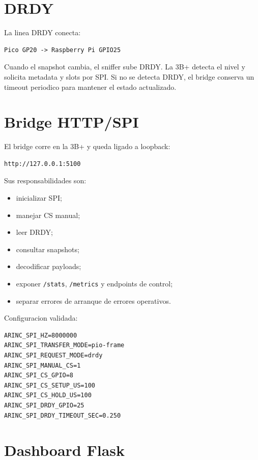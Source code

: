 \documentclass[12pt,a4paper,oneside]{report}
\begin{document}
\section{DRDY}

La linea DRDY conecta:

\begin{lstlisting}
Pico GP20 -> Raspberry Pi GPIO25
\end{lstlisting}

Cuando el snapshot cambia, el sniffer sube DRDY. La 3B+ detecta el nivel y
solicita metadata y slots por SPI. Si no se detecta DRDY, el bridge conserva un
timeout periodico para mantener el estado actualizado.

\section{Bridge HTTP/SPI}

El bridge corre en la 3B+ y queda ligado a loopback:

\begin{lstlisting}
http://127.0.0.1:5100
\end{lstlisting}

Sus responsabilidades son:

\begin{itemize}
  \item inicializar SPI;
  \item manejar CS manual;
  \item leer DRDY;
  \item consultar snapshots;
  \item decodificar payloads;
  \item exponer \texttt{/stats}, \texttt{/metrics} y endpoints de control;
  \item separar errores de arranque de errores operativos.
\end{itemize}

Configuracion validada:

\begin{lstlisting}
ARINC_SPI_HZ=8000000
ARINC_SPI_TRANSFER_MODE=pio-frame
ARINC_SPI_REQUEST_MODE=drdy
ARINC_SPI_MANUAL_CS=1
ARINC_SPI_CS_GPIO=8
ARINC_SPI_CS_SETUP_US=100
ARINC_SPI_CS_HOLD_US=100
ARINC_SPI_DRDY_GPIO=25
ARINC_SPI_DRDY_TIMEOUT_SEC=0.250
\end{lstlisting}

\section{Dashboard Flask}
\end{document}
